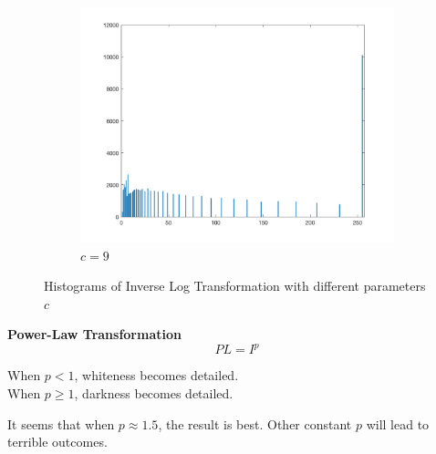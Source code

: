 \documentclass{article}
\newcommand{\tb}{\textbf}
\begin{document}
\begin{enumerate}[label=(\alph*)]
\begin{figure}[!htb]
\begin{subfigure}[b]{0.3\textwidth}
            \includegraphics[width=\textwidth]{img/hist_ILT9.png}
            \caption{$c = 9$}
        \end{subfigure}
        \caption{Histograms of Inverse Log Transformation with different parameters $c$}
        \label{Histograms of Inverse Log Transformation with different parameters $c$}        
    \end{figure}

    \newpage
    \tb{Power-Law Transformation} $$PL = I^p$$
    
    When $p < 1$, whiteness becomes detailed. \\
    When $p \ge 1$, darkness becomes detailed.
    
    It seems that when $p \approx 1.5$, the result is best. Other constant $p$ will lead to terrible outcomes.
    

\end{enumerate}
\end{document}

